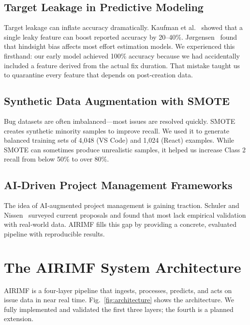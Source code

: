 \documentclass[conference]{IEEEtran}
\begin{document}
\subsection{Target Leakage in Predictive Modeling}
Target leakage can inflate accuracy dramatically. Kaufman et al.~\cite{kaufman2012} showed that a single leaky feature can boost reported accuracy by 20--40\%. Jørgensen~\cite{jorgensen2006} found that hindsight bias affects most effort estimation models. We experienced this firsthand: our early model achieved 100\% accuracy because we had accidentally included a feature derived from the actual fix duration. That mistake taught us to quarantine every feature that depends on post‑creation data.

\subsection{Synthetic Data Augmentation with SMOTE}
Bug datasets are often imbalanced—most issues are resolved quickly. SMOTE~\cite{chawla2002} creates synthetic minority samples to improve recall. We used it to generate balanced training sets of 4,048 (VS Code) and 1,024 (React) examples. While SMOTE can sometimes produce unrealistic samples, it helped us increase Class 2 recall from below 50\% to over 80\%.

\subsection{AI‑Driven Project Management Frameworks}
The idea of AI‑augmented project management is gaining traction. Schuler and Nissen~\cite{schuler2022} surveyed current proposals and found that most lack empirical validation with real‑world data. AIRIMF fills this gap by providing a concrete, evaluated pipeline with reproducible results.

\section{The AIRIMF System Architecture}
AIRIMF is a four‑layer pipeline that ingests, processes, predicts, and acts on issue data in near real time. Fig.~\ref{fig:architecture} shows the architecture. We fully implemented and validated the first three layers; the fourth is a planned extension.
\end{document}
